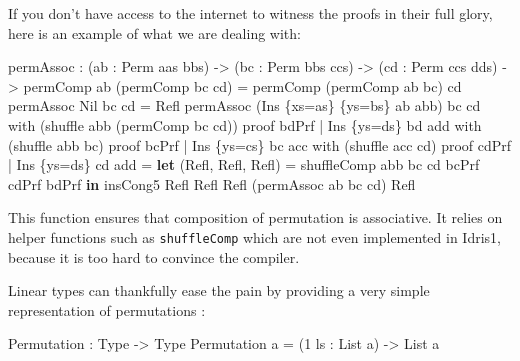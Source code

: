 \documentclass[
]{article}
\newenvironment{Shaded}{}{}
\newcommand{\DataTypeTok}[1]{\textcolor[rgb]{0.56,0.13,0.00}{#1}}
\newcommand{\DecValTok}[1]{\textcolor[rgb]{0.25,0.63,0.44}{#1}}
\newcommand{\KeywordTok}[1]{\textcolor[rgb]{0.00,0.44,0.13}{\textbf{#1}}}
\newcommand{\NormalTok}[1]{#1}
\newcommand{\OperatorTok}[1]{\textcolor[rgb]{0.40,0.40,0.40}{#1}}
\newcommand{\OtherTok}[1]{\textcolor[rgb]{0.00,0.44,0.13}{#1}}
\begin{document}
If you don't have access to the internet to witness the proofs in their
full glory, here is an example of what we are dealing with:

\begin{Shaded}
\begin{Highlighting}[]
\NormalTok{permAssoc }\OperatorTok{:}\NormalTok{ (ab }\OperatorTok{:} \DataTypeTok{Perm}\NormalTok{ aas bbs) }\OtherTok{{-}\textgreater{}}\NormalTok{ (bc }\OperatorTok{:} \DataTypeTok{Perm}\NormalTok{ bbs ccs) }\OtherTok{{-}\textgreater{}}\NormalTok{ (cd }\OperatorTok{:} \DataTypeTok{Perm}\NormalTok{ ccs dds)}
         \OtherTok{{-}\textgreater{}}\NormalTok{ permComp ab (permComp bc cd) }\OtherTok{=}\NormalTok{ permComp (permComp ab bc) cd}
\NormalTok{permAssoc }\DataTypeTok{Nil}\NormalTok{ bc cd }\OtherTok{=} \DataTypeTok{Refl}
\NormalTok{permAssoc (}\DataTypeTok{Ins}\NormalTok{ \{xs}\OtherTok{=}\NormalTok{as\} \{ys}\OtherTok{=}\NormalTok{bs\} ab\textquotesingle{} abb) bc cd with (shuffle abb (permComp bc cd)) proof bdPrf}
  \OperatorTok{|} \DataTypeTok{Ins}\NormalTok{ \{ys}\OtherTok{=}\NormalTok{ds\} bd\textquotesingle{} add with (shuffle abb bc) proof bcPrf}
    \OperatorTok{|} \DataTypeTok{Ins}\NormalTok{ \{ys}\OtherTok{=}\NormalTok{cs\} bc\textquotesingle{} acc with (shuffle acc cd) proof cdPrf}
      \OperatorTok{|} \DataTypeTok{Ins}\NormalTok{ \{ys}\OtherTok{=}\NormalTok{ds\textquotesingle{}\} cd\textquotesingle{} ad\textquotesingle{}d }\OtherTok{=}
        \KeywordTok{let}\NormalTok{ (}\DataTypeTok{Refl}\NormalTok{, }\DataTypeTok{Refl}\NormalTok{, }\DataTypeTok{Refl}\NormalTok{) }\OtherTok{=}\NormalTok{ shuffleComp abb bc cd bcPrf cdPrf bdPrf }\KeywordTok{in}
\NormalTok{        insCong5 }\DataTypeTok{Refl} \DataTypeTok{Refl} \DataTypeTok{Refl}\NormalTok{ (permAssoc ab\textquotesingle{} bc\textquotesingle{} cd\textquotesingle{}) }\DataTypeTok{Refl}
\end{Highlighting}
\end{Shaded}

This function ensures that composition of permutation is associative. It
relies on helper functions such as \texttt{shuffleComp} which are not
even implemented in Idris1, because it is too hard to convince the
compiler.

Linear types can thankfully ease the pain by providing a very simple
representation of permutations :

\begin{Shaded}
\begin{Highlighting}[]
\DataTypeTok{Permutation} \OperatorTok{:} \DataTypeTok{Type} \OtherTok{{-}\textgreater{}} \DataTypeTok{Type}
\DataTypeTok{Permutation}\NormalTok{ a }\OtherTok{=}\NormalTok{ (}\DecValTok{1}\NormalTok{ ls }\OperatorTok{:} \DataTypeTok{List}\NormalTok{ a) }\OtherTok{{-}\textgreater{}} \DataTypeTok{List}\NormalTok{ a}
\end{Highlighting}
\end{Shaded}
\end{document}
